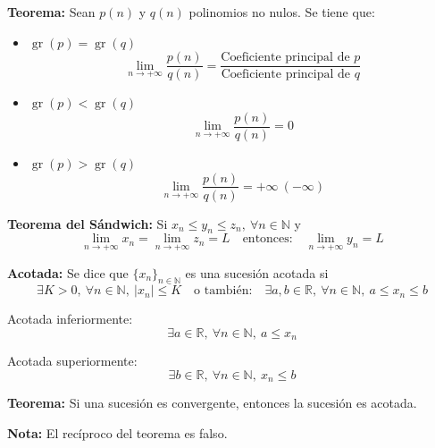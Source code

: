 \documentclass[11pt,a4paper]{article}
\begin{document}
\textbf{Teorema:} Sean $p(n)$ y $q(n)$ polinomios no nulos. Se tiene que:
\begin{itemize}
  \item $\operatorname{gr}(p) = \operatorname{gr}(q)$
  \[\lim_{n\to+\infty}\frac{p(n)}{q(n)} = \frac{\text{Coeficiente principal de } p}{\text{Coeficiente principal de } q}\]
\end{itemize}
\begin{minipage}[t]{0.485\textwidth}
\begin{itemize}
  \item $\operatorname{gr}(p) < \operatorname{gr}(q)$
  \[\lim_{n\to+\infty}\frac{p(n)}{q(n)} = 0\]
\end{itemize}
\end{minipage}\hfill
\begin{minipage}[t]{0.485\textwidth}
\begin{itemize}
  \item $\operatorname{gr}(p) > \operatorname{gr}(q)$
  \[\lim_{n\to+\infty}\frac{p(n)}{q(n)} = +\infty\ (-\infty)\]
\end{itemize}
\end{minipage}

\textcolor{verde}{\textbf{Teorema del Sándwich:}} Si $x_n \leq y_n \leq z_n,\ \forall n \in \mathbb{N}$ y
\[
\lim_{n\to+\infty}x_n = \lim_{n\to+\infty}z_n = L \quad \text{entonces:} \quad \lim_{n\to+\infty}y_n = L
\]

\textcolor{naranja}{\textbf{Acotada:}} Se dice que $\{x_n\}_{n\in\mathbb{N}}$ es una sucesión
acotada si
\[
\exists K > 0,\ \forall n \in \mathbb{N},\ |x_n| \leq K \quad \text{o también:} \quad
\exists a, b \in \mathbb{R},\ \forall n \in \mathbb{N},\ a \leq x_n \leq b
\]
\begin{minipage}[t]{0.485\textwidth}
\textcolor{azul}{Acotada inferiormente:}
\[\exists a \in \mathbb{R},\ \forall n \in \mathbb{N},\ a \leq x_n\]
\end{minipage}\hfill
\begin{minipage}[t]{0.485\textwidth}
\textcolor{azul}{Acotada superiormente:}
\[\exists b \in \mathbb{R},\ \forall n \in \mathbb{N},\ x_n \leq b\]
\end{minipage}


\textbf{Teorema:} Si una sucesión es convergente, entonces la sucesión es acotada.

\textbf{Nota:} El recíproco del teorema es falso.
\end{document}
